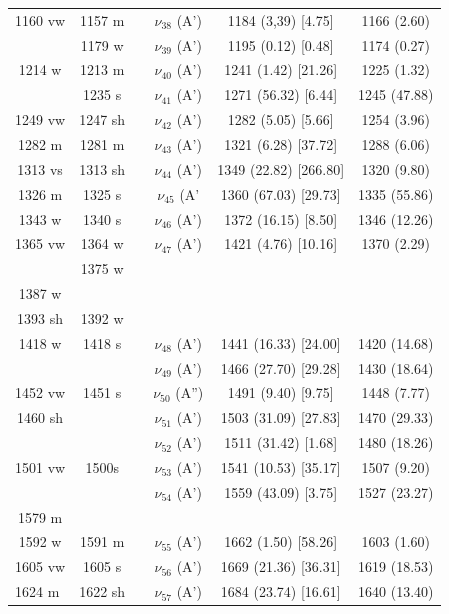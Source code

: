 \begin{table}[H]
\begin{center}
\begin{threeparttable}
\begin{tabular}{c c c c c c}
1160 vw& 1157 m&  & $\nu_{38}$ (A’)  & 1184 (3,39) [4.75] & 1166 (2.60) \\ 
& 1179 w&  & $\nu_{39}$ (A’) & 1195 (0.12) [0.48] & 1174 (0.27) \\ 
1214 w& 1213 m&  & $\nu_{40}$ (A’) & 1241 (1.42) [21.26] & 1225 (1.32) \\ 
& 1235 s&  & $\nu_{41}$ (A’) & 1271 (56.32) [6.44] & 1245 (47.88) \\ 
1249 vw& 1247 sh&  & $\nu_{42}$ (A’)  & 1282 (5.05) [5.66] & 1254 (3.96)\\ 
1282 m& 1281 m&  & $\nu_{43}$ (A’)& 1321 (6.28) [37.72] & 1288 (6.06)\\ 
1313 vs & 1313 sh &  & $\nu_{44}$ (A’) & 1349 (22.82) [266.80] & 1320 (9.80) \\ 
1326 m& 1325 s&  & $\nu_{45}$ (A’ & 1360 (67.03) [29.73] & 1335 (55.86) \\ 
1343 w& 1340 s&  & $\nu_{46}$ (A’)& 1372 (16.15) [8.50] & 1346 (12.26)\\ 
1365 vw& 1364 w&  & $\nu_{47}$ (A’) & 1421 (4.76) [10.16] & 1370 (2.29) \\ 
& 1375 w&  & \multicolumn{1}{c}{} &  & \multicolumn{1}{l}{} \\ 
1387 w &  &  & \multicolumn{1}{l}{} &  & \multicolumn{1}{l}{} \\ 
1393 sh & 1392 w &  & \multicolumn{1}{l}{} &  & \multicolumn{1}{l}{} \\ 
1418 w& 1418 s&  & $\nu_{48}$ (A’) & 1441 (16.33) [24.00] & 1420 (14.68)\\ 
&  &  & $\nu_{49}$ (A’) & \multicolumn{1}{c}{1466 (27.70) [29.28]} & 1430 (18.64) \\ 
1452 vw& 1451 s&  & \multicolumn{1}{c}{$\nu_{50}$ (A”)} & \multicolumn{1}{c}{1491 (9.40) [9.75]
} & 1448 (7.77)\\ 
1460 sh &  &  & \multicolumn{1}{c}{$\nu_{51}$ (A’)} & \multicolumn{1}{c}{1503 (31.09) [27.83]} & 1470 (29.33) \\ 
&  &  & $\nu_{52}$ (A’) & \multicolumn{1}{c}{1511 (31.42) [1.68]} & 1480 (18.26) \\ 
1501 vw& 1500s&  & $\nu_{53}$ (A’) & \multicolumn{1}{c}{1541 (10.53) [35.17]} & 
1507 (9.20) \\ 
&  &  & $\nu_{54}$ (A’) & \multicolumn{1}{c}{1559 (43.09) [3.75]} & 1527 (23.27) \\ 
1579 m &  &  & \multicolumn{1}{l}{} &  & \multicolumn{1}{l}{} \\ 
1592 w & 1591 m &  & $\nu_{55}$ (A’) & \multicolumn{1}{c}{1662 (1.50) [58.26]} & 1603 (1.60) \\ 
\multicolumn{1}{l}{1605 vw} & 1605 s
&  & 
$\nu_{56}$ (A’) & \multicolumn{1}{c}{1669 (21.36) [36.31]} & 
1619 (18.53) \\ 
\multicolumn{1}{l}{1624 m} & 1622 sh &  & $\nu_{57}$ (A’) & \multicolumn{1}{c}{1684 (23.74) [16.61]} & 1640 (13.40) \\ 	
			\bottomrule
			

\end{tabular}
\end{threeparttable}
\end{center}
\end{table}
